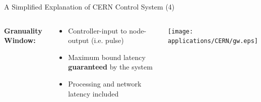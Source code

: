 \documentclass[compress,red]{beamer}
\begin{document}
\begin{frame}{A Simplified Explanation of CERN Control System (4)}

\begin{columns}[c]
   {\bf Granuality Window: }
    \begin{center}
      \begin{itemize}
	    \item Controller-input to node-output (i.e. pulse)
	    \item Maximum bound latency {\bf guaranteed } by the system
	    \item Processing and network latency included
      \end{itemize}

    \end{center}
    \begin{center}
      \begin{center}
      \texttt{[image: applications/CERN/gw.eps]}
      \end{center}
    \end{center}
\end{columns}

\end{frame}

% 
% 
% 
\end{document}
